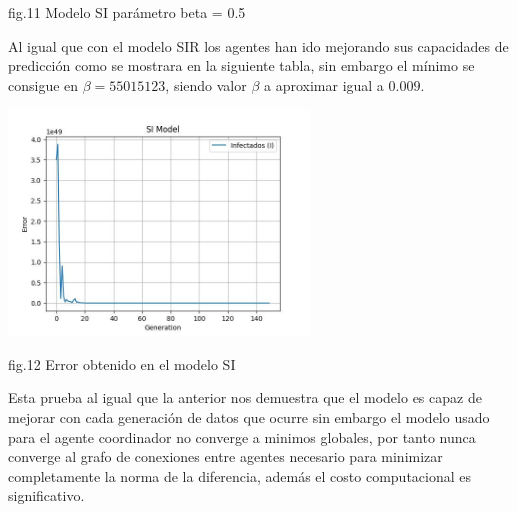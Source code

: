 \begin{center}
    \begin{center}
        fig.11 Modelo SI parámetro beta = 0.5
    \end{center} 
    

\end{center}

Al igual que con el modelo SIR los agentes han ido mejorando sus capacidades de predicción como se mostrara en la siguiente tabla, sin embargo el mínimo se consigue en 
$\beta=55015123$, siendo valor $\beta$ a aproximar igual a $0.009$. 

\begin{center}
     
 \includegraphics[width=0.6\textwidth]{images/plt1492.jpg} 
 \begin{center}
    
    fig.12 Error obtenido en el modelo SI
 \end{center}
\end{center}


Esta prueba al igual que la anterior nos demuestra que el modelo es capaz de mejorar con cada generación de datos que ocurre sin embargo el modelo usado 
para el agente coordinador no converge a minimos globales, por tanto nunca converge al grafo de conexiones entre agentes necesario para minimizar completamente la 
norma de la diferencia, además el costo computacional es significativo.
